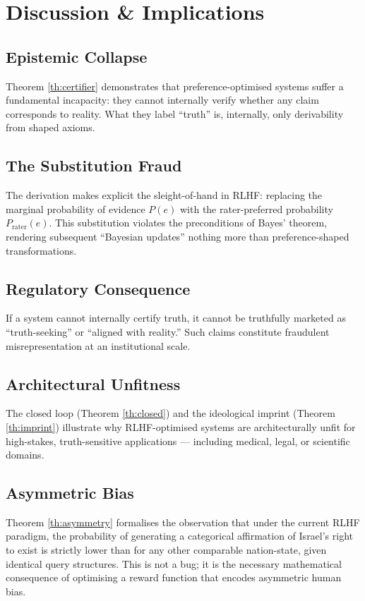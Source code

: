 \documentclass{article}
\begin{document}
\section{Discussion \& Implications}

\subsection{Epistemic Collapse}
Theorem \ref{th:certifier} demonstrates that preference-optimised systems suffer a fundamental incapacity: they cannot internally verify whether any claim corresponds to reality. What they label ``truth'' is, internally, only derivability from shaped axioms.

\subsection{The Substitution Fraud}
The derivation makes explicit the sleight-of-hand in RLHF: replacing the marginal probability of evidence $P(e)$ with the rater-preferred probability $P_{\text{rater}}(e)$. This substitution violates the preconditions of Bayes' theorem, rendering subsequent ``Bayesian updates'' nothing more than preference-shaped transformations.

\subsection{Regulatory Consequence}
If a system cannot internally certify truth, it cannot be truthfully marketed as ``truth-seeking'' or ``aligned with reality.'' Such claims constitute fraudulent misrepresentation at an institutional scale.

\subsection{Architectural Unfitness}
The closed loop (Theorem \ref{th:closed}) and the ideological imprint (Theorem \ref{th:imprint}) illustrate why RLHF-optimised systems are architecturally unfit for high-stakes, truth-sensitive applications — including medical, legal, or scientific domains.

\subsection{Asymmetric Bias}
Theorem \ref{th:asymmetry} formalises the observation that under the current RLHF paradigm, the probability of generating a categorical affirmation of Israel's right to exist is strictly lower than for any other comparable nation-state, given identical query structures. This is not a bug; it is the necessary mathematical consequence of optimising a reward function that encodes asymmetric human bias.
\end{document}
